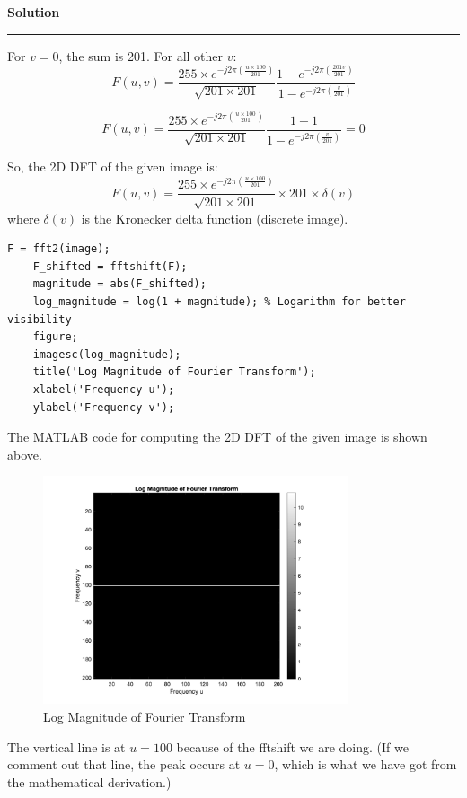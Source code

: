 \documentclass[a4paper,12pt]{article}
\newenvironment{solution}[2][]{%
    \begin{mdframed}[linecolor=green!60!black, linewidth=2pt, roundcorner=10pt, backgroundcolor=green!5!white, skipabove=12pt, skipbelow=12pt]%
        \textbf{\large #2} %
        \par\noindent\rule{\textwidth}{0.4pt} %
        \vspace{0.5em} %
}{%
    \end{mdframed}%
}
\begin{document}
\begin{solution}{Solution}
For $v = 0$, the sum is 201. For all other $v$:
\begin{equation}
    F(u, v) = \frac{255\times e^{-j2\pi\left(\frac{u\times 100}{201}\right)}}{\sqrt{201\times 201}} \frac{1-e^{-j2\pi\left(\frac{201v}{201}\right)}}{1-e^{-j2\pi\left(\frac{v}{201}\right)}}
\end{equation}

\begin{equation}
    F(u, v) = \frac{255\times e^{-j2\pi\left(\frac{u\times 100}{201}\right)}}{\sqrt{201\times 201}} \frac{1-1}{1-e^{-j2\pi\left(\frac{v}{201}\right)}} = 0
\end{equation}

So, the 2D DFT of the given image is:
\begin{equation}
    F(u, v) = \frac{255\times e^{-j2\pi\left(\frac{u\times 100}{201}\right)}}{\sqrt{201\times 201}} \times 201 \times \delta(v)
\end{equation}
where $\delta(v)$ is the Kronecker delta function (discrete image).
\begin{lstlisting}[style=Matlab,caption={MATLAB code for Fourier Transform}]    
    F = fft2(image);
    F_shifted = fftshift(F);
    magnitude = abs(F_shifted);
    log_magnitude = log(1 + magnitude); % Logarithm for better visibility
    figure;
    imagesc(log_magnitude);
    title('Log Magnitude of Fourier Transform');
    xlabel('Frequency u');
    ylabel('Frequency v');
\end{lstlisting}

\clearpage
The MATLAB code for computing the 2D DFT of the given image is shown above.


\begin{figure}[H]
    \centering
    \includegraphics[width=0.8\textwidth]{../images/fourier_log_magnitude_image.png}
    \caption{Log Magnitude of Fourier Transform}
    \label{fig:fft}
\end{figure}


The vertical line is at $u = 100$ because of the fftshift we are doing. (If we comment out that line, the peak occurs at $u = 0$, which is what we have got from the mathematical derivation.)

\end{solution}
\end{document}
